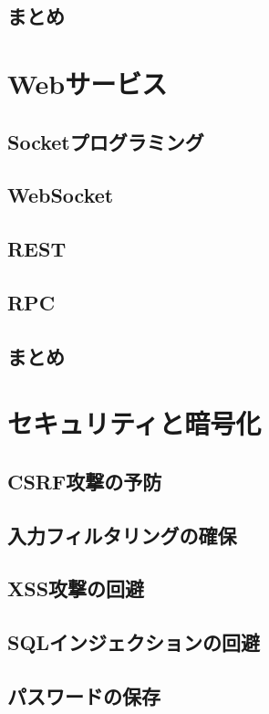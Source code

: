 \subsection{まとめ}


\section{Webサービス}

\subsection{Socketプログラミング}

\subsection{WebSocket}

\subsection{REST}

\subsection{RPC}

\subsection{まとめ}


\section{セキュリティと暗号化}

\subsection{CSRF攻撃の予防}
\subsection{入力フィルタリングの確保}
\subsection{XSS攻撃の回避}
\subsection{SQLインジェクションの回避}
\subsection{パスワードの保存}

